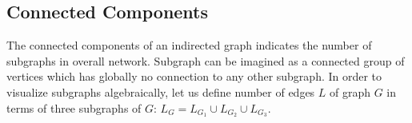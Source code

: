 \documentclass[12pt]{article}
\begin{document}
%
%
%
%
%
%
%
%
%
%
%
%
%
%
\subsection{Connected Components}

The connected components of an indirected graph indicates the number of subgraphs in overall network. Subgraph can be imagined as a connected group of vertices which has globally no connection to any other subgraph. In order to visualize subgraphs algebraically, let us define number of edges $L$ of graph $G$ in terms of three subgraphs of $G$: $L_G = L_{G_1}\cup L_{G_2}\cup L_{G_3}$. 
%
%
%
%
%
%
%
%
%
%
\end{document}
